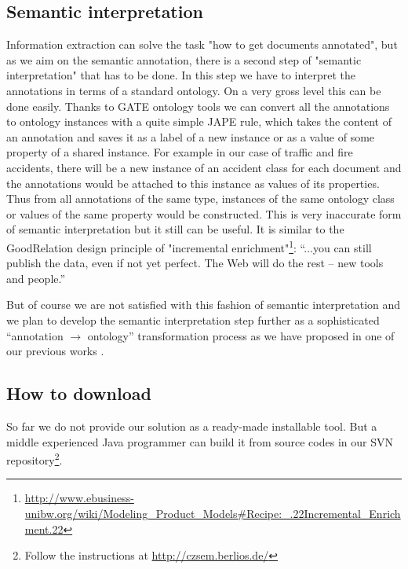 \documentclass[runningheads,a4paper]{llncs}
\begin{document}
\subsection{Semantic interpretation}
\label{sec:SemanticInterpretation}
Information extraction can solve the task "how to get documents annotated", but as we aim on the semantic annotation, there is a second step of "semantic interpretation" that has to be done. In this step we have to interpret the annotations in terms of a standard ontology. On a very gross level this can be done easily. Thanks to GATE ontology tools \cite{Bon04b} we can convert all the annotations to ontology instances with a quite simple JAPE \cite{Cunningham00jape:a} rule, which takes the content of an annotation and saves it as a label of a new instance or as a value of some property of a shared instance. For example in our case of traffic and fire accidents, there will be a new instance of an accident class for each document and the annotations would be attached to this instance as values of its properties. Thus from all annotations of the same type, instances of the same ontology class or values of the same property would be constructed. This is very inaccurate form of semantic interpretation but it still can be useful. It is similar to the GoodRelation \cite{DBLP:conf/ekaw/Hepp08} design principle of "incremental enrichment"\footnote{\url{http://www.ebusiness-unibw.org/wiki/Modeling_Product_Models#Recipe:_.22Incremental_Enrichment.22}}:
``...you can still publish the data, even if not yet perfect. The Web will do the rest -- new tools and people.''	

But of course we are not satisfied with this fashion of semantic interpretation and we plan to develop the semantic interpretation step further as a sophisticated ``annotation $\rightarrow$ ontology'' transformation process as we have proposed in one of our previous works \cite{biblio:DeVoComputingaggregations2008}.

\subsection{How to download}
So far we do not provide our solution as a ready-made installable tool. But a middle experienced Java programmer can build it from source codes in our SVN repository\footnote{Follow the instructions at \url{http://czsem.berlios.de/}}.
\end{document}
